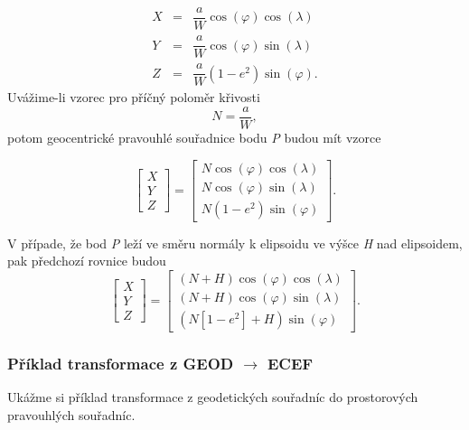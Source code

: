 \documentclass[11pt,a4paper]{article}
\begin{document}
\begin{eqnarray}
X &=& \dfrac{a}{W}\cos{\left(\varphi\right)}\cos{\left(\lambda\right)} \\
Y &=& \dfrac{a}{W}\cos{\left(\varphi\right)}\sin{\left(\lambda\right)} \\
Z &=& \dfrac{a}{W}\left(1-e^{2}\right)\sin{\left(\varphi\right)}.
\end{eqnarray}
Uvážime-li vzorec pro příčný poloměr křivosti 
\begin{equation}
N = \dfrac{a}{W},
\end{equation}
potom geocentrické pravouhlé souřadnice bodu \textit{P} budou mít vzorce

\begin{equation}
\begin{bmatrix}
X\\
Y\\
Z
\end{bmatrix} = 
\begin{bmatrix}
N\cos{\left(\varphi\right)}\cos{\left(\lambda\right)}\\
N\cos{\left(\varphi\right)}\sin{\left(\lambda\right)}\\
N\left(1-e^{2}\right)\sin{\left(\varphi\right)}
\end{bmatrix}.
\end{equation}

V případe, že bod \textit{P} leží ve směru normály k elipsoidu ve výšce \textit{H} nad elipsoidem, pak předchozí rovnice budou
\begin{equation}
\begin{bmatrix}
X\\
Y\\
Z
\end{bmatrix} = 
\begin{bmatrix}
\left(N+H\right)\cos{\left(\varphi\right)}\cos{\left(\lambda\right)}\\
\left(N+H\right)\cos{\left(\varphi\right)}\sin{\left(\lambda\right)}\\
\left(N\left[1-e^{2}\right]+H\right)\sin{\left(\varphi\right)}
\end{bmatrix}.
\label{rov:geodEcef}
\end{equation}

\subsubsection{Příklad transformace z GEOD $\rightarrow$ ECEF}

Ukážme si příklad transformace z geodetických souřadníc do prostorových pravouhlých souřadníc.
\end{document}
